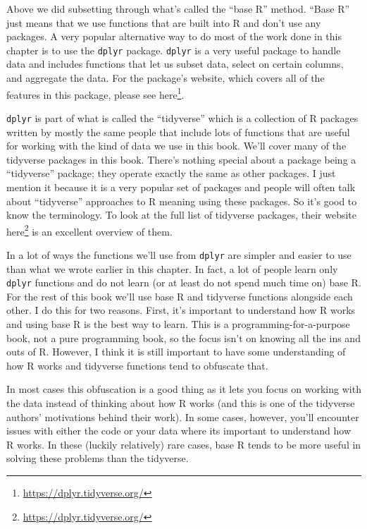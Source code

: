 \documentclass[
]{krantz}
\renewcommand{\href}[2]{#2\footnote{\url{#1}}}
\begin{document}
Above we did subsetting through what's called the ``base R'' method. ``Base R'' just means that we use functions that are built into R and don't use any packages. A very popular alternative way to do most of the work done in this chapter is to use the \texttt{dplyr} package. \texttt{dplyr} is a very useful package to handle data and includes functions that let us subset data, select on certain columns, and aggregate the data. For the package's website, which covers all of the features in this package, please see \href{https://dplyr.tidyverse.org/}{here}.

\texttt{dplyr} is part of what is called the ``tidyverse'' which is a collection of R packages written by mostly the same people that include lots of functions that are useful for working with the kind of data we use in this book. We'll cover many of the tidyverse packages in this book. There's nothing special about a package being a ``tidyverse'' package; they operate exactly the same as other packages. I just mention it because it is a very popular set of packages and people will often talk about ``tidyverse'' approaches to R meaning using these packages. So it's good to know the terminology. To look at the full list of tidyverse packages, their website \href{https://dplyr.tidyverse.org/}{here} is an excellent overview of them.

In a lot of ways the functions we'll use from \texttt{dplyr} are simpler and easier to use than what we wrote earlier in this chapter. In fact, a lot of people learn only \texttt{dplyr} functions and do not learn (or at least do not spend much time on) base R. For the rest of this book we'll use base R and tidyverse functions alongside each other. I do this for two reasons. First, it's important to understand how R works and using base R is the best way to learn. This is a programming-for-a-purpose book, not a pure programming book, so the focus isn't on knowing all the ins and outs of R. However, I think it is still important to have some understanding of how R works and tidyverse functions tend to obfuscate that.

In most cases this obfuscation is a good thing as it lets you focus on working with the data instead of thinking about how R works (and this is one of the tidyverse authors' motivations behind their work). In some cases, however, you'll encounter issues with either the code or your data where its important to understand how R works. In these (luckily relatively) rare cases, base R tends to be more useful in solving these problems than the tidyverse.
\end{document}
